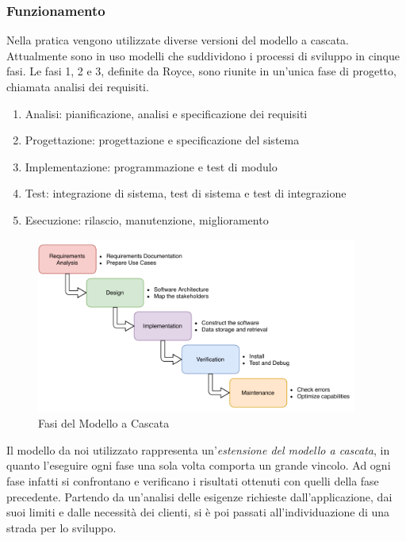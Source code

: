\subsubsection{Funzionamento}
Nella pratica vengono utilizzate diverse versioni del modello a cascata. Attualmente sono in uso modelli che suddividono i processi di sviluppo in cinque fasi. Le fasi 1, 2 e 3, definite da Royce, sono riunite in un’unica fase di progetto, chiamata analisi dei requisiti.
\begin{enumerate}
    \item Analisi: pianificazione, analisi e specificazione dei requisiti
    \item Progettazione: progettazione e specificazione del sistema
    \item Implementazione: programmazione e test di modulo
    \item Test: integrazione di sistema, test di sistema e test di integrazione
    \item Esecuzione: rilascio, manutenzione, miglioramento
\end{enumerate}
\begin{figure}[H]
    \centering
    \includegraphics[width=0.94\textwidth]{images/02_1_waterfall_model.pdf}
    \caption{Fasi del Modello a Cascata}
    \label{fig:waterfallmodel}
\end{figure}

Il modello da noi utilizzato rappresenta un'\textit{estensione del modello a cascata}, in quanto l'eseguire ogni fase una sola volta comporta un grande vincolo. Ad ogni fase infatti si confrontano e verificano i risultati ottenuti con quelli della fase precedente. Partendo da un'analisi delle esigenze richieste dall'applicazione, dai suoi limiti e dalle necessità dei clienti, si è poi passati all'individuazione di una strada per lo sviluppo.

